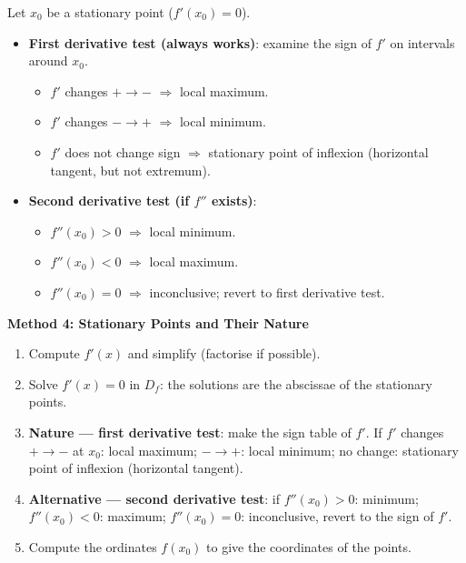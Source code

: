\documentclass[11pt]{article}
\newcommand{\cle}[1]{{\popxbold\color{popdark}#1}}
\begin{document}
\begin{aretenir}
Let $x_0$ be a stationary point ($f'(x_0)=0$).
\begin{itemize}
\item \textbf{First derivative test (always works)}: examine the sign of $f'$ on intervals around $x_0$.
  \begin{itemize}
  \item $f'$ changes $+\to-$ $\Rightarrow$ local maximum.
  \item $f'$ changes $-\to+$ $\Rightarrow$ local minimum.
  \item $f'$ does not change sign $\Rightarrow$ stationary point of inflexion (horizontal tangent, but not extremum).
  \end{itemize}
\item \textbf{Second derivative test (if $f''$ exists)}:
  \begin{itemize}
  \item $f''(x_0)>0$ $\Rightarrow$ local minimum.
  \item $f''(x_0)<0$ $\Rightarrow$ local maximum.
  \item $f''(x_0)=0$ $\Rightarrow$ inconclusive; revert to first derivative test.
  \end{itemize}
\end{itemize}
\end{aretenir}

\textbf{Method 4: Stationary Points and Their Nature}\par

\begin{methode}
\begin{enumerate}
\item Compute $f'(x)$ and simplify (factorise if possible).
\item Solve $f'(x)=0$ in $D_f$: the solutions are the abscissae of the \cle{stationary points}.
\item \textbf{Nature — first derivative test}: make the sign table of $f'$. If $f'$ changes $+\to-$ at $x_0$: local maximum; $-\to+$: local minimum; no change: stationary point of inflexion (horizontal tangent).
\item \textbf{Alternative — second derivative test}: if $f''(x_0)>0$: minimum; $f''(x_0)<0$: maximum; $f''(x_0)=0$: inconclusive, revert to the sign of $f'$.
\item Compute the ordinates $f(x_0)$ to give the coordinates of the points.
\end{enumerate}
\end{methode}
\end{document}
